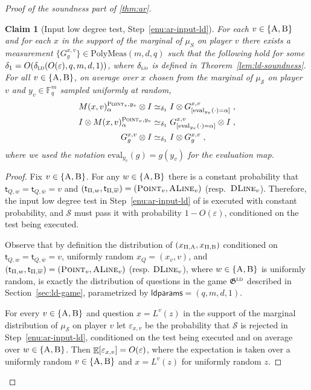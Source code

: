 \documentclass[11pt]{article}
\newtheorem{claim}[theorem]{Claim}
\theoremstyle{definition}
\newcommand{\ol}[1]{\overline{#1}}
\newcommand{\F}{\ensuremath{\mathbb{F}}}
\newcommand{\ot}{\otimes}
\newcommand{\ld}{\textsc{ld}}
\newcommand{\eps}{\varepsilon}
\newcommand{\E}{\mathop{\mathbb{E}}\displaylimits}
\newcommand{\game}{\mathfrak{G}}
\newcommand{\sampler}{\mathcal{S}}
\newcommand{\strategy}{\mathscr{S}}
\newcommand{\labelstyle}[1]{\ensuremath{\textsc{#1}}\xspace}
\newcommand{\tvarstyle}[1]{\mathsf{#1}}
\newcommand{\tvar}{\ensuremath{\tvarstyle{t}}}
\newcommand{\alice}{\labelstyle{A}}
\newcommand{\bob}{\labelstyle{B}}
\newcommand{\typestyle}[1]{\ensuremath{\textsc{#1}}\xspace}
\newcommand{\Point}{\typestyle{Point}}
\newcommand{\ALine}{\typestyle{ALine}}
\newcommand{\DLine}{\typestyle{DLine}}
\newcommand{\ldparams}{\mathsf{ldparams}}
\newcommand{\polymeas}[3]{\mathrm{PolyMeas}(#1,#2,#3)}
\newcommand{\eval}{\mathrm{eval}}
\begin{document}
\begin{proof}[Proof of the soundness part of \cref{thm:ar}]
	\begin{claim}[Input low degree test, Step~\ref{enu:ar-input-ld}]\label{claim:ar-3}
    For each $v \in \{\alice,\bob\}$ and for each $x$ in the support of the
    marginal of $\mu_S$ on player $v$ there exists a measurement
    $\{G^{{x},v}_{g}\} \in \polymeas{m}{d}{q}$ such that the following hold for
    some $\delta_1 = O(\delta_{\ld}(O({\eps}), q, m, d, 1))$, where
    $\delta_{\ld}$ is defined in Theorem~\ref{lem:ld-soundness}.
    For all $v\in\{\alice,\bob\}$, on average over ${x}$ chosen from the
    marginal of $\mu_{\sampler}$ on player $v$ and $y_v\in \F_q^m$ sampled
    uniformly at random,
    \begin{align}
      M({x}, v)^{\Point_v,y_v}_{\alpha}\ot I
      & \simeq_{\delta_1} I \ot G^{{x}, v}_{[\eval_{y_v}(\cdot) =
        \alpha]}\;, \label{eq:ld-single-input} \\
      I\ot  M({x}, v)^{\Point_v,y_v}_{\alpha}
      & \simeq_{\delta_1}  G^{{x}, v}_{[\eval_{y_v}(\cdot) =
        \alpha]} \ot I\;, \label{eq:ld-single-input-b} \\
      G^{{x}, v}_{g} \ot I
      & \simeq_{\delta_1} I \ot G^{{x},
        v}_{g}\;,\label{eq:ld-self-input}
    \end{align}
    where we used the notation $\eval_{y_v}(g)=g(y_v)$ for the evaluation map.
	\end{claim}
	
	\begin{proof}
    Fix $v\in\{\alice,\bob\}$.
    For any $w\in\{\alice,\bob\}$ there is a constant probability that
    $\tvar_{Q,w} = \tvar_{Q,\ol{w}} = v$ and $(\tvar_{\Pi,w}, \tvar_{\Pi,
      \ol{w}}) = (\Point_{v}, \ALine_{v})$ (resp.\ $\DLine_v$).
    Therefore, the input low degree test in Step~\ref{enu:ar-input-ld} of
     is executed with constant probability, and
    $\strategy$ must pass it with probability $1-O(\eps)$, conditioned on the
    test being executed.
			
    Observe that by definition the distribution of $(x_{\Pi,\alice},
    x_{\Pi,\bob})$ conditioned on $\tvar_{Q,w} = \tvar_{Q,\ol{w}} = v$,
    uniformly random $x_Q = (x_v,v)$, and $(\tvar_{\Pi,w}, \tvar_{\Pi, \ol{w}})
    = (\Point_{v}, \ALine_{v})$ (resp.
    $\DLine_v$), where $w\in\{\alice,\bob\}$ is uniformly random, is exactly the
    distribution of questions in the game $\game^\ld$ described in
    Section~\ref{sec:ld-game}, parametrized by $\ldparams = (q, m, d, 1)$.
			
    For every $v\in\{\alice,\bob\}$ and question $x=L^v(z)$ in the support of
    the marginal distribution of $\mu_\sampler$ on player $v$ let $\eps_{x,v}$
    be the probability that $\strategy$ is rejected in Step~\ref{enu:ar-input-ld},
    conditioned on the test being executed and on average over
    $w\in\{\alice,\bob\}$.
    Then $\E[\eps_{x,v}] = O(\eps)$, where the expectation is taken over a
    uniformly random $v\in\{\alice,\bob\}$ and $x=L^v(z)$ for uniformly random
    $z$.


\end{proof}
\end{proof}
\end{document}
